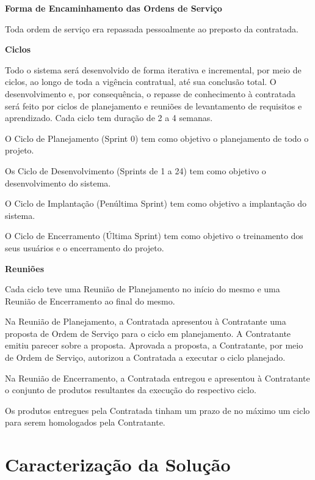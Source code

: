 \textbf{Forma de Encaminhamento das Ordens de Serviço}

Toda ordem de serviço era repassada pessoalmente ao preposto da contratada.

\textcolor{red}{}


\textbf{Ciclos}

Todo o sistema será desenvolvido de forma iterativa e incremental, por meio de ciclos, ao longo de toda a vigência contratual, até sua conclusão total. O desenvolvimento e, por consequência, o repasse de conhecimento à contratada será feito por ciclos de planejamento e reuniões de levantamento de requisitos e aprendizado. Cada ciclo tem duração de 2 a 4 semanas.

O Ciclo de Planejamento (Sprint 0) tem como objetivo o planejamento de todo o projeto.

Os Ciclo de Desenvolvimento (Sprints de 1 a 24) tem como objetivo o desenvolvimento do sistema.

O Ciclo de Implantação (Penúltima Sprint) tem como objetivo a implantação do sistema.

O Ciclo de Encerramento (Última Sprint) tem como objetivo o treinamento dos seus usuários e o encerramento do projeto.

\textbf{Reuniões}

Cada ciclo teve uma Reunião de Planejamento no início do mesmo e uma Reunião de Encerramento ao final do mesmo.

Na Reunião de Planejamento, a Contratada apresentou à Contratante uma proposta de Ordem de Serviço para o ciclo em planejamento. A Contratante emitiu parecer sobre a proposta. Aprovada a proposta, a Contratante, por meio de Ordem de Serviço, autorizou a Contratada a executar o ciclo planejado.

Na Reunião de Encerramento, a Contratada entregou e apresentou à Contratante o conjunto de produtos resultantes da execução do respectivo ciclo.

Os produtos entregues pela Contratada tinham um prazo de no máximo um ciclo para serem homologados pela Contratante.

\section[Caracterização da Solução]{Caracterização da Solução}

